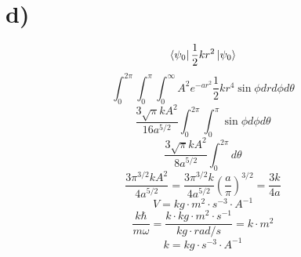\documentclass[english]{article}
\begin{document}
\section*{d)}
$$\bra{\psi_0}\frac{1}{2}kr^2\ket{\psi_0}$$
$$\int_0^{2\pi}\int_0^{\pi}\int_0^{\infty}A^2e^{-ar^2}\frac{1}{2}kr^4\sin\phi drd\phi d\theta$$
$$\frac{3\sqrt{\pi}kA^2}{16a^{5/2}}\int_0^{2\pi}\int_0^{\pi}\sin\phi d\phi d\theta$$
$$\frac{3\sqrt{\pi}kA^2}{8a^{5/2}}\int_0^{2\pi}d\theta$$
$$\frac{3\pi^{3/2}kA^2}{4a^{5/2}}=\frac{3\pi^{3/2}k}{4a^{5/2}}\left(\frac{a}{\pi}\right)^{3/2}=\frac{3k}{4a}$$
$$V=kg\cdot m^2\cdot s^{-3}\cdot A^{-1}$$
$$\frac{k\hbar}{m\omega}=\frac{k\cdot kg\cdot m^2 \cdot s^{-1}}{kg\cdot rad/s}=k\cdot m^2$$
$$k=kg\cdot s^{-3}\cdot A^{-1}$$
\end{document}
